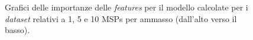 \begin{figure}[H]
\centering
{}\\

\\

\caption{Grafici delle importanze delle \textit{features} per il modello calcolate per i \textit{dataset} relativi a 1, 5 e 10 MSPs per ammasso (dall'alto verso il basso).}
\label{fig:importanze}
\end{figure}

